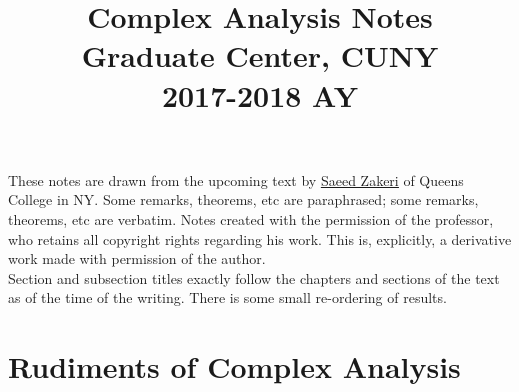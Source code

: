 \documentclass{article}
\title{Complex Analysis Notes\\
Graduate Center, CUNY\\
2017-2018 AY}
\date{}
\begin{document}
\maketitle

{\large These notes are drawn from the upcoming text by \href{http://qcpages.qc.cuny.edu/~zakeri/}{\underline{Saeed Zakeri}} of Queens College in NY. Some remarks, theorems, etc are paraphrased; some remarks, theorems, etc are verbatim. Notes created with the permission of the professor, who retains all copyright rights regarding his work. This is, explicitly, a derivative work made with permission of the author.
\\

\noindent Section and subsection titles exactly follow the chapters and sections of the text as of the time of the writing. There is some small re-ordering of results.}

\newpage

\tableofcontents

\newpage

\section{Rudiments of Complex Analysis}
\end{document}

